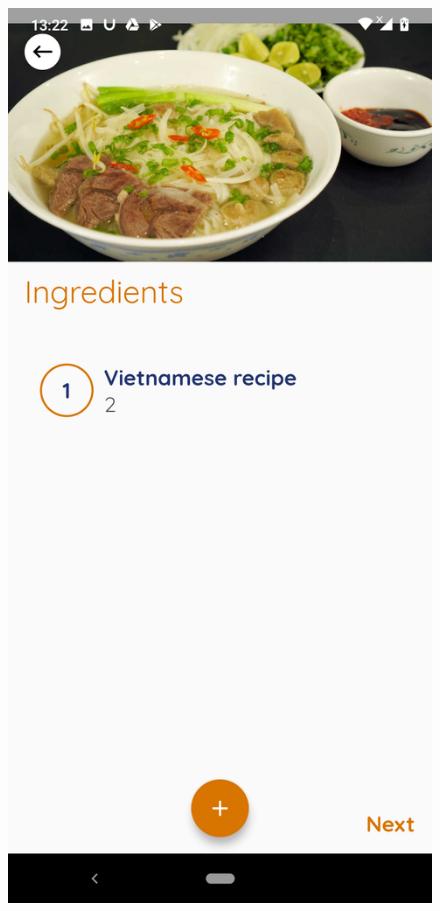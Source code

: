 \documentclass{article}
\begin{document}
\begin{figure}[h!]
        \includegraphics[scale=0.1]{Images/pho_ingre.jpg}

\end{figure}
\end{document}

